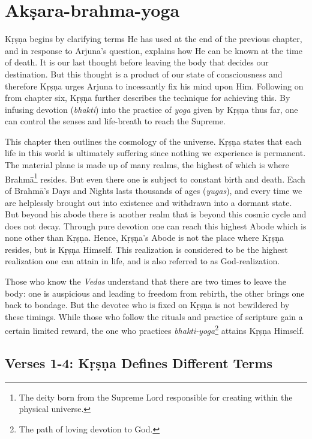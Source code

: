 \chapter{Akṣara-brahma-yoga}\label{chap-aksara-brahma-yoga}

\noindent Kṛṣṇa begins by clarifying terms He has used at the end of the previous chapter, and in response to Arjuna’s question, explains how He can be known at the time of death. It is our last thought before leaving the body that decides our destination. But this thought is a product of our state of consciousness and therefore Kṛṣṇa urges Arjuna to incessantly fix his mind upon Him. Following on from chapter six, Kṛṣṇa further describes the technique for achieving this. By infusing devotion (\textit{bhakti}) into the practice of \textit{yoga} given by Kṛṣṇa thus far, one can control the senses and life-breath to reach the Supreme.

This chapter then outlines the cosmology of the universe. Kṛṣṇa states that each life in this world is ultimately suffering since nothing we experience is permanent. The material plane is made up of many realms, the highest of which is where Brahmā\footnote{The deity born from the Supreme Lord responsible for creating within the physical universe.} resides. But even there one is subject to constant birth and death. Each of Brahmā’s Days and Nights lasts thousands of ages (\textit{yugas}), and every time we are helplessly brought out into existence and withdrawn into a dormant state. But beyond his abode there is another realm that is beyond this cosmic cycle and does not decay. Through pure devotion one can reach this highest Abode which is none other than Kṛṣṇa. Hence, Kṛṣṇa's Abode is not the place where Kṛṣṇa resides, but is Kṛṣṇa Himself. This realization is considered to be the highest realization one can attain in life, and is also referred to as God-realization.

Those who know the \textit{Vedas} understand that there are two times to leave the body: one is auspicious and leading to freedom from rebirth, the other brings one back to bondage. But the devotee who is fixed on Kṛṣṇa is not bewildered by these timings. While those who follow the rituals and practice of scripture gain a certain limited reward, the one who practices \textit{bhakti-yoga}\footnote{The path of loving devotion to God.} attains Kṛṣṇa Himself.

\section{Verses 1-4: Kṛṣṇa Defines Different Terms}\label{sec-verses-1-4-krsna-defines-different-terms}


